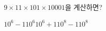 $9\times 11\times 101\times 10001$을 계산하면?
\begin{choices32}{$10^6-1$}{$10^6$}{$10^6+1$}{$10^8-1$}{$10^8$}\end{choices32}
